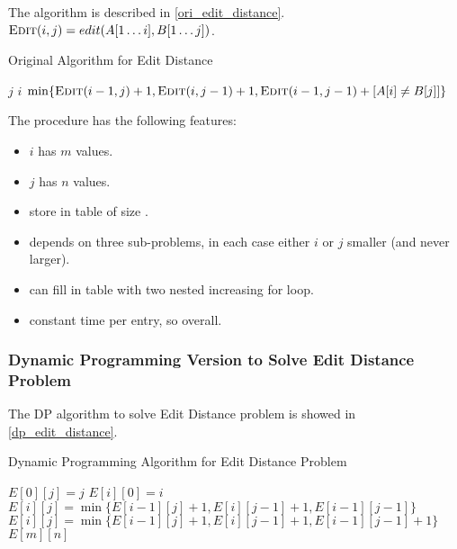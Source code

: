 The algorithm is described in \cref{ori_edit_distance}.
$\textsc{Edit} (i, j) = edit(A[1 \ldots i], B[1 \ldots j])$.

\begin{algorithm}[H]
    \caption{Original Algorithm for Edit Distance}\label{ori_edit_distance}
    \begin{algorithmic}
                \Return $j$
            \EndIf
                \Return $i$
            \EndIf
            \Return $\min\{\textsc{Edit} (i-1,j)+1,\textsc{Edit} (i,j-1)+1,\textsc{Edit} (i-1,j-1)+[A[i]\neq B[j]]\}$
        \EndProcedure
    \end{algorithmic}
\end{algorithm}

\observation

The procedure  has the following features:

\begin{itemize}
    \item $i$ has $m$ values.
    \item $j$ has $n$ values.
    \item store in table of size .
    \item {} depends on three sub-problems,
        in each case either $i$ or $j$ smaller (and never larger).
    \item can fill in table with two nested increasing for loop.
    \item constant time per entry, so  overall.
\end{itemize}

\subsubsection{Dynamic Programming Version to Solve Edit Distance Problem}

The DP algorithm to solve Edit Distance problem is showed in \cref{dp_edit_distance}.

\begin{algorithm}[H]
\caption{Dynamic Programming Algorithm for Edit Distance Problem}\label{dp_edit_distance}
\begin{algorithmic}[1]
            \State $E[0][j]=j$
        \EndFor
            \State $E[i][0]=i$
        \EndFor
                    \State $E[i][j] = \min\{E[i-1][j]+1, E[i][j-1]+1, E[i-1][j-1]\}$
                \Else
                    \State $E[i][j] = \min\{E[i-1][j]+1, E[i][j-1]+1, E[i-1][j-1]+1\}$
                \EndIf
            \EndFor
        \EndFor
        \Return $E[m][n]$
    \EndProcedure
\end{algorithmic}
\end{algorithm}

